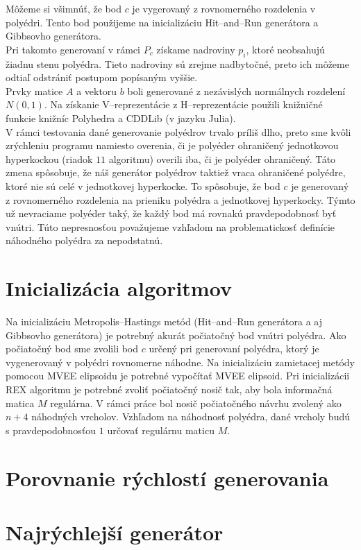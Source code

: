 Môžeme si všimnúť, že bod $c$ je vygerovaný z rovnomerného rozdelenia v polyédri. Tento bod použijeme na inicializáciu Hit--and--Run generátora a Gibbsovho generátora.\\

Pri takomto generovaní v rámci $P_c$ získame nadroviny $p_i$, ktoré neobsahujú žiadnu stenu polyédra. Tieto nadroviny sú zrejme nadbytočné, preto ich môžeme odtiaľ odstrániť postupom popísaným vyššie.\\

Prvky matice $A$ a vektoru $b$ boli generované z nezávislých normálnych rozdelení $N(0,1)$. Na získanie V--reprezentácie z H--reprezentácie použili knižničné funkcie knižníc Polyhedra a CDDLib (v jazyku Julia).\\

V rámci testovania dané generovanie polyédrov trvalo príliš dlho, preto sme kvôli zrýchleniu programu namiesto overenia, či je polyéder ohraničený jednotkovou hyperkockou (riadok $11$ algoritmu) overili iba, či je polyéder ohraničený. Táto zmena spôsobuje, že náš generátor polyédrov taktiež vraca ohraničené polyédre, ktoré nie sú celé v jednotkovej hyperkocke. To spôsobuje, že bod $c$ je generovaný z rovnomerného rozdelenia na prieniku polyédra a jednotkovej hyperkocky. Týmto už nevraciame polyéder taký, že každý bod má rovnakú pravdepodobnosť byť vnútri. Túto nepresnosťou považujeme vzhľadom na problematickosť definície náhodného polyédra za nepodstatnú.\\


\section{Inicializácia algoritmov}

Na inicializáciu Metropolis--Hastings metód (Hit--and--Run generátora a aj Gibbsovho generátora) je potrebný akurát počiatočný bod vnútri polyédra. Ako počiatočný bod sme zvolili bod $c$ určený pri generovaní polyédra, ktorý je vygenerovaný v polyédri rovnomerne náhodne.
Na inicializáciu zamietacej metódy pomocou MVEE elipsoidu je potrebné vypočítať MVEE elipsoid. Pri inicializácii REX algoritmu je potrebné zvoliť počiatočný nosič tak, aby bola informačná matica $M$ regulárna. V rámci práce bol nosič počiatočného návrhu zvolený ako $n+4$ náhodných vrcholov. Vzhľadom na náhodnosť polyédra, dané vrcholy budú s pravdepodobnosťou $1$ určovať regulárnu maticu $M$.

\section{Porovnanie rýchlostí generovania}

\section{Najrýchlejší generátor}